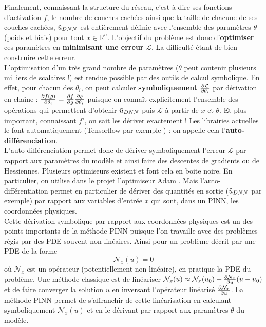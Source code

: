 Finalement, connaissant la structure du réseau, c'est à dire ses fonctions d'activation $f$, le nombre de couches cachées ainsi que la taille de chacune de ses couches cachées, $\Tilde{u}_{DNN}$ est entièrement définie avec l'ensemble des paramètres $\theta$ (poids et biais) pour tout $x\in \mathbb{R}^n$. L'objectif du problème est donc d'\textbf{optimiser} ces paramètres en \textbf{minimisant une erreur} $\mathcal {L}$. La difficulté étant de bien construire cette erreur.\\

L'optimisation d'un très grand nombre de paramètres ($\theta$ peut contenir plusieurs milliers de scalaires !) est rendue possible par des outils de calcul symbolique. En effet, pour chacun des $\theta_i$, on peut calculer \textbf{symboliquement} $\pder[\mathcal{L}]{\theta_i}$ par dérivation en chaîne : $\pder[f(g)]{\theta_i} = \pder[f]{g} \pder[g]{\theta_i}$ puisque on connaît explicitement l'ensemble des opérations qui permettent d'obtenir $\Tilde{u}_{DNN}$ puis $\mathcal{L}$ à partir de $x$ et $\theta$. Et plus important, connaissant $f'$, on sait les dériver exactement ! Les librairies actuelles le font automatiquement (Tensorflow par exemple \cite{PartialDifferentialEquations}) : on appelle cela l'\textbf{auto-différenciation}. \\

L'auto-différenciation permet donc de dériver symboliquement l'erreur $\mathcal{L}$ par rapport aux paramètres du modèle et ainsi faire des descentes de gradients ou de Hessiennes. Plusieurs optimiseurs existent et font cela en boite noire. En particulier, on utilise dans le projet l'optimiseur Adam \cite{kingmaAdamMethodStochastic2017}. Mais l'auto-différentiation permet en particulier de dériver des quantités en sortie ($\Tilde{u}_{DNN}$ par exemple) par rapport aux variables d'entrée $x$ qui sont, dans un PINN, les coordonnées physiques. \\

Cette dérivation symbolique par rapport aux coordonnées physiques est un des points importants de la méthode PINN puisque l'on travaille avec des problèmes régis par des PDE souvent non linéaires. Ainsi pour un problème décrit par une PDE de la forme 
\begin{equation}
    \mathcal{N}_{x}(u) = 0
\end{equation}
où $\mathcal{N}_{x}$ est un opérateur (potentiellement non-linéaire), en pratique la PDE du problème. Une méthode classique est de linéariser $\mathcal{N}_{x}(u) \approx \mathcal{N}_{x}(u_0) + \pder[\mathcal{N}_x]{u} (u-u_0)$ et de faire converger la solution $u$ en inversant l'opérateur linéarisé $\pder[\mathcal{N}_x]{u}$. La méthode PINN permet de s'affranchir de cette linéarisation en calculant symboliquement $\mathcal{N}_x (u)$ et en le dérivant par rapport aux paramètres $\theta$  du modèle.\\

